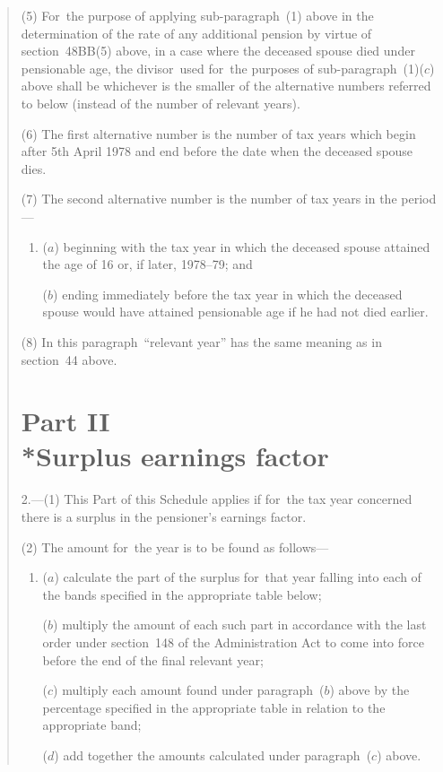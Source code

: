 \documentclass[12pt,a4paper]{article}
\begin{document}
\begin{quotation}
(5) For~the purpose of applying sub-paragraph~(1)  above in the determination of the rate of any additional pension by virtue of section~48BB(5)  above, in a case where the deceased spouse died under pensionable age, the divisor~used for~the purposes of sub-paragraph~(1)($c$)  above shall be whichever is the smaller of the alternative numbers referred to below (instead of the number of relevant years).

(6) The first alternative number is the number of tax years which begin after 5th April 1978 and end before the date when the deceased spouse dies.

(7) The second alternative number is the number of tax years in the period—
\begin{enumerate}\item[]
($a$) beginning with the tax year in which the deceased spouse attained the age of 16 or, if later, 1978--79; and

($b$) ending immediately before the tax year in which the deceased spouse would have attained pensionable age if he had not died earlier.
\end{enumerate}

(8) In this paragraph~“relevant year” has the same meaning as in section~44 above.

\section*{Part II\\*Surplus earnings factor}

2.---(1) This Part of this Schedule applies if for~the tax year concerned there is a surplus in the pensioner’s earnings factor.

(2) The amount for~the year is to be found as follows—
\begin{enumerate}\item[]
($a$) calculate the part of the surplus for~that year falling into each of the bands specified in the appropriate table below;

($b$) multiply the amount of each such part in accordance with the last order under section~148 of the Administration Act to come into force before the end of the final relevant year;

($c$) multiply each amount found under paragraph~($b$)  above by the percentage specified in the appropriate table in relation to the appropriate band;

($d$) add together the amounts calculated under paragraph~($c$)  above.
\end{enumerate}


\end{quotation}
\end{document}
